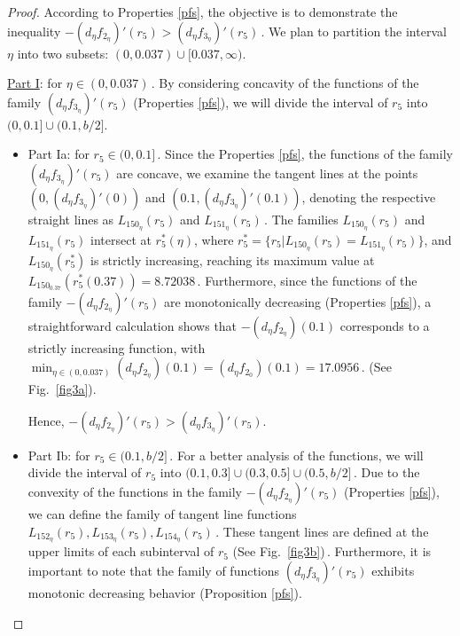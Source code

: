 \documentclass[final,11pt]{article}
\numberwithin{equation}{section}
\theoremstyle{definition}
\begin{document}
\begin{proof}
According to Properties \ref{pfs}, the objective is to demonstrate the inequality $-(d_{\eta}f_{2_{\eta}})'(r_{5})>(d_{\eta}f_{3_{\eta}})'(r_{5})$\,. We plan to partition the interval $\eta$ into two subsets: $(0,0.037)\cup[0.037,\infty)$.

\underline{Part I}: for $\eta\in(0,0.037)$\,. By considering concavity of the functions of the family $(d_{\eta}f_{3_{\eta}})'(r_{5})$ (Properties \ref{pfs}), we will divide the interval of $r_ {5}$ into $(0,0.1]\cup(0.1,b/2]$.
\begin{itemize}
\item Part Ia: for $r_{5}\in(0,0.1]$\,. Since the Properties \ref{pfs}, the functions of the family $\left(d_{\eta}f_{3_{\eta}}\right)'(r_{5})$ are concave, we examine the tangent lines at the points $(0,(d_{\eta}f_{3_{\eta}})'(0))$ and $(0.1,(d_{\eta}f_{3_{\eta}})'(0.1))$, denoting the respective straight lines as $L_{150_{\eta}}(r_{5})$ and $L_{151_{\eta}}(r_{5})$\,. The families $L_{150_{\eta}}(r_{5})$ and $L_{151_{\eta}}(r_{5})$ intersect at $r_{5}^{*}(\eta)$, where $r_{5}^{*}=\{r_{5}|L_{150_{\eta}}(r_{5})=L_{151_{\eta}}(r_{5})\}$, and $L_{150_{\eta}}(r_{5}^{*})$ is strictly increasing, reaching its maximum value at $L_{150_{0.37}}(r_{5}^{*}(0.37)) = 8.72038$\,. Furthermore, since the functions of the family $-\left(d_{\eta}f_{2_{\eta}}\right)'(r_{5})$ are monotonically decreasing (Properties \ref{pfs}), a straightforward calculation shows that $-\left(d_{\eta}f_{2_{\eta}}\right)(0.1)$ corresponds to a strictly increasing function, with $\min_{\eta\in (0,0.037)}\left(d_{\eta} f_{2_{\eta}}\right)(0.1)=\left(d_{\eta}f_{2_{0}}\right)(0.1)=17.0956$\,. (See Fig.~\ref{fig3a}).

Hence, $-(d_{\eta}f_{2_{\eta}})'(r_{5})>(d_{\eta}f_{3_{\eta}})'(r_{5})$.

\item Part Ib: for $r_{5}\in(0.1,b/2]$\,. For a better analysis of the functions, we will divide the interval of
$r_{5}$ into $(0.1, 0.3] \cup (0.3, 0.5] \cup (0.5, b/2]$\,. Due to the convexity of the functions in the family $-\left(d_{\eta}f_{2_{\eta}}\right)'(r_{5})$ (Properties \ref{pfs}), we can define the family of tangent line functions $L_{152_{\eta}}(r_{5}), L_{153_{\eta}}(r_{5}), L_{154_{\eta}}(r_{5})$\,. These tangent lines are defined at the upper limits of each subinterval of $r_{5}$ (See Fig.~\ref{fig3b})\,. Furthermore, it is important to note that the family of functions $\left(d_{\eta}f_{3_{\eta}}\right)'(r_{5})$ exhibits monotonic decreasing behavior (Proposition \ref{pfs}).


\end{itemize}
\end{proof}
\end{document}
